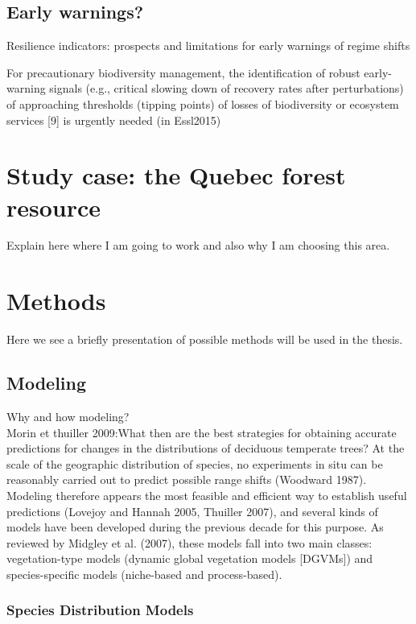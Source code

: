 \subsection{Early warnings?}

Resilience indicators: prospects and limitations for early warnings of regime shifts

For precautionary biodiversity management, the identification of robust early-warning signals (e.g., critical slowing down of recovery rates after perturbations) of approaching thresholds (tipping points) of losses of biodiversity or ecosystem services [9] is urgently needed (in Essl2015)

\section{Study case: the Quebec forest resource}

Explain here where I am going to work and also why I am choosing this area.

\section{Methods}

Here we see a briefly presentation of possible methods will be used in the thesis.

\subsection{Modeling}

Why and how modeling?\\
Morin et thuiller 2009:{What then are the best strategies for obtaining accurate predictions for changes in the distributions of deciduous temperate trees? At the scale of the geographic distribution of species, no experiments in situ can be reasonably carried out to predict possible range shifts (Woodward 1987). Modeling therefore appears the most feasible and efficient way to establish useful predictions (Lovejoy and Hannah 2005, Thuiller 2007), and several kinds of models have been developed during the previous decade for this purpose. As reviewed by Midgley et al. (2007), these models fall into two main classes: vegetation-type models (dynamic global vegetation models [DGVMs]) and species-specific models (niche-based and process-based).}

\subsubsection{Species Distribution Models}\label{sdm}

